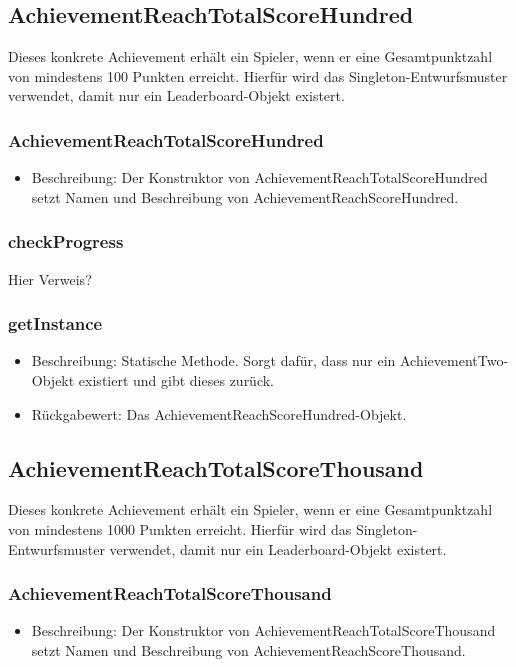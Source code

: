 \documentclass[a4paper]{scrreprt}
\begin{document}
	\subsection{AchievementReachTotalScoreHundred}
	Dieses konkrete Achievement erhält ein Spieler, wenn er eine Gesamtpunktzahl von mindestens 100 Punkten erreicht. Hierfür wird das Singleton-Entwurfsmuster verwendet, damit nur ein Leaderboard-Objekt existert.

	\subsubsection{AchievementReachTotalScoreHundred}
	\begin{itemize}
		\item Beschreibung: Der Konstruktor von AchievementReachTotalScoreHundred setzt Namen und Beschreibung von AchievementReachScoreHundred.
	\end{itemize}
	\subsubsection{checkProgress}
	Hier Verweis?
	\subsubsection{getInstance}
	\begin{itemize}
		\item Beschreibung: Statische Methode. Sorgt dafür, dass nur ein AchievementTwo-Objekt existiert und gibt dieses zurück.
		\item Rückgabewert: Das AchievementReachScoreHundred-Objekt.
	\end{itemize}

	\subsection{AchievementReachTotalScoreThousand}
	Dieses konkrete Achievement erhält ein Spieler, wenn er eine Gesamtpunktzahl von mindestens 1000 Punkten erreicht. Hierfür wird das Singleton-Entwurfsmuster verwendet, damit nur ein Leaderboard-Objekt existert.

	\subsubsection{AchievementReachTotalScoreThousand}
	\begin{itemize}
		\item Beschreibung: Der Konstruktor von AchievementReachTotalScoreThousand setzt Namen und Beschreibung von AchievementReachScoreThousand.
	\end{itemize}
\end{document}
